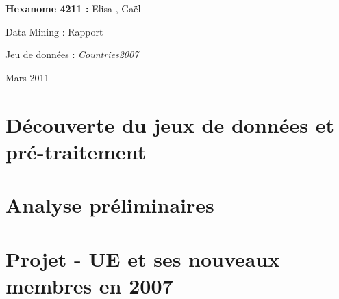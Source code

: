 \documentclass[a4paper]{article}
\begin{document}
\begin{titlepage}
\begin{center}
 
 \vfill
		\textbf{Hexanome 4211 :} 
		Elisa , Gaël 
		
\vfill
	
		\begin{Huge}
		Data Mining : Rapport \\
		\end{Huge} 

\vfill
	
		\begin{Large}
		
		
		Jeu de données :  \textit{Countries2007}\\
		\end{Large} 


\vfill		
		\begin{Large}
		Mars 2011
		\end{Large}
	\end{center}

\end{titlepage}

\newpage
\tableofcontents
\newpage

\part{Découverte du jeux de données et pré-traitement}

\part{Analyse préliminaires}

\part{Projet - UE et ses nouveaux membres en 2007}

 
\end{document}
